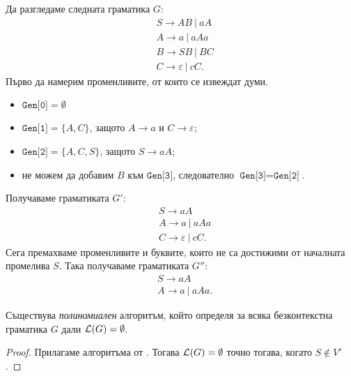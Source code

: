 {\scriptsize
  \begin{multicols}{2}
\begin{example}
  Да разгледаме следната граматика $G$:
  \begin{align*}
    & S \to AB\ |\ aA\\
    & A \to a\ |\ aAa\\
    & B \to SB\ |\ BC\\
    & C \to \varepsilon\ |\ cC.
  \end{align*}
  Първо да намерим променливите, от които се извеждат думи.
  \begin{itemize}
  \item
    $\texttt{Gen[0]} = \emptyset$
  \item 
    $\texttt{Gen[1]} = \{A, C\}$, защото $A \to a$ и $C \to \varepsilon$;
  \item
    $\texttt{Gen[2]} = \{A, C, S\}$, защото $S \to aA$;
  \item
    не можем да добавим $B$ към $\texttt{Gen[3]}$, следователно $\texttt{Gen[3]} = \texttt{Gen[2]}$.
  \end{itemize}
  Получаваме граматиката $G'$:
  \begin{align*}
    & S \to aA\\
    & A \to a\ |\ aAa\\
    & C \to \varepsilon\ |\ cC.
  \end{align*}
  Сега премахваме променливите и буквите, които не са достижими от началната промелива $S$. Така получаваме граматиката $G''$:
  \begin{align*}
    & S \to aA\\
    & A \to a\ |\ aAa.
  \end{align*}
\end{example}

\end{multicols}
}


\begin{framed}
  \begin{cor}
    Съществува {\em полиномиален} алгоритъм, който определя за всяка безконтекстна граматика $G$ дали $\mathcal{L}(G) = \emptyset$.
  \end{cor}  
\end{framed}
\begin{proof}
  Прилагаме алгоритъма от .
  Тогава $\mathcal{L}(G) = \emptyset$ точно тогава, когато $S \not\in V'$.  
\end{proof}

